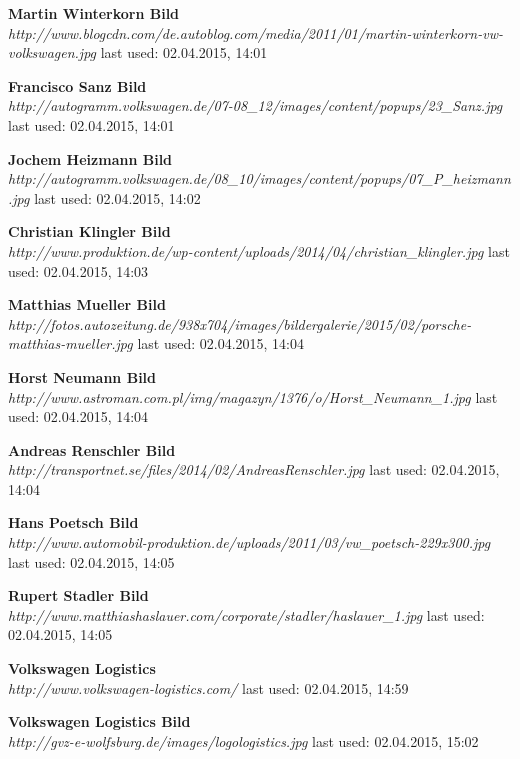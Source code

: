 \documentclass[12pt]{article}
\begin{document}
\begin{thebibliography}{56}
\textbf{Martin Winterkorn Bild} \\
\textit{
	http://www.blogcdn.com/de.autoblog.com/media/2011/01/martin-winterkorn-vw-volkswagen.jpg
}
\newline last used: 02.04.2015, 14:01

\textbf{Francisco Sanz Bild} \\
\textit{
	http://autogramm.volkswagen.de/07-08\_12/images/content/popups/23\_Sanz.jpg
}
\newline last used: 02.04.2015, 14:01

\textbf{Jochem Heizmann Bild} \\
\textit{
	http://autogramm.volkswagen.de/08\_10/images/content/popups/07\_P\_heizmann.jpg
}
\newline last used: 02.04.2015, 14:02

\textbf{Christian Klingler Bild} \\
\textit{
	http://www.produktion.de/wp-content/uploads/2014/04/christian\_klingler.jpg
}
\newline last used: 02.04.2015, 14:03

\textbf{Matthias Mueller Bild} \\
\textit{
	http://fotos.autozeitung.de/938x704/images/bildergalerie/2015/02/porsche-matthias-mueller.jpg
}
\newline last used: 02.04.2015, 14:04

\textbf{Horst Neumann Bild} \\
\textit{
	http://www.astroman.com.pl/img/magazyn/1376/o/Horst\_Neumann\_1.jpg
}
\newline last used: 02.04.2015, 14:04

\textbf{Andreas Renschler Bild} \\
\textit{
	http://transportnet.se/files/2014/02/AndreasRenschler.jpg
}
\newline last used: 02.04.2015, 14:04

\textbf{Hans Poetsch Bild} \\
\textit{
	http://www.automobil-produktion.de/uploads/2011/03/vw\_poetsch-229x300.jpg
}
\newline last used: 02.04.2015, 14:05

\textbf{Rupert Stadler Bild} \\
\textit{
	http://www.matthiashaslauer.com/corporate/stadler/haslauer\_1.jpg
}
\newline last used: 02.04.2015, 14:05

\textbf{Volkswagen Logistics} \\
\textit{
	http://www.volkswagen-logistics.com/
}
\newline last used: 02.04.2015, 14:59

\textbf{Volkswagen Logistics Bild} \\
\textit{
	http://gvz-e-wolfsburg.de/images/logologistics.jpg
}
\newline last used: 02.04.2015, 15:02


\end{thebibliography}
\end{document}
